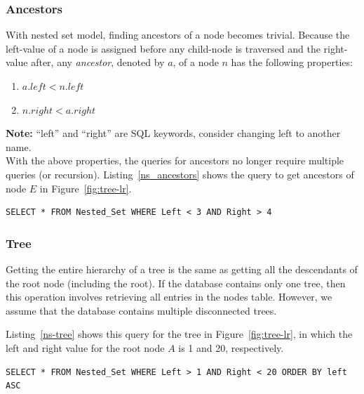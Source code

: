 \subsubsection{Ancestors}

With nested set model, finding ancestors of a node becomes trivial. Because the left-value of a node is assigned before any child-node is traversed and the right-value after, any \emph{ancestor}, denoted by $a$, of a node $n$ has the following properties:

\begin{enumerate}
\item $a.left < n.left$
\item $n.right < a.right$
\end{enumerate}

\textbf{Note:} ``left'' and ``right'' are SQL keywords, consider changing left to another name.\\

With the above properties, the queries for ancestors no longer require multiple queries (or recursion). Listing~\ref{ns_ancestors} shows the query to get ancestors of node $E$ in Figure~\ref{fig:tree-lr}.

\begin{minipage}{\linewidth}
\begin{lstlisting}[frame=single]
SELECT * FROM Nested_Set WHERE Left < 3 AND Right > 4
\end{lstlisting}	
\end{minipage}

\subsubsection{Tree}

Getting the entire hierarchy of a tree is the same as getting all the descendants of the root node (including the root). If the database contains only one tree, then this operation involves retrieving all entries in the nodes table. However, we assume that the database contains multiple disconnected trees.

Listing~\ref{ns-tree} shows this query for the tree in Figure~\ref{fig:tree-lr}, in which the left and right value for the root node $A$ is 1 and 20, respectively.

\begin{minipage}{\linewidth}
\begin{lstlisting}[frame=single]
SELECT * FROM Nested_Set WHERE Left > 1 AND Right < 20 ORDER BY left ASC
\end{lstlisting}	
\end{minipage}


